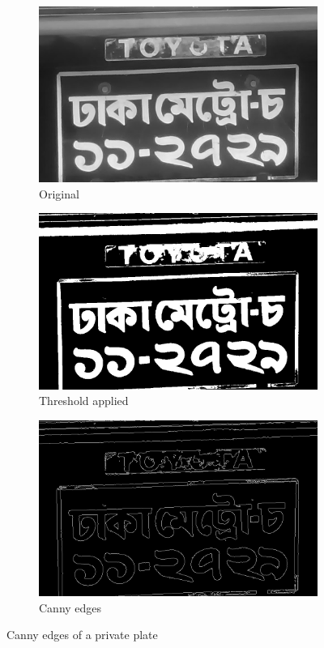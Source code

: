 \begin{figure}
\begin{subfigure}{0.33\textwidth}
    \centering
    \includegraphics[width=0.9\linewidth]{./img/experiment/stage.9/02-private}
    \caption{Original}
\end{subfigure}
\begin{subfigure}{0.33\textwidth}
    \centering
    \includegraphics[width=0.9\linewidth]{./img/experiment/stage.10/02-private}
    \caption{Threshold applied}
\end{subfigure}
\begin{subfigure}{0.33\textwidth}
    \centering
    \includegraphics[width=0.9\linewidth]{./img/experiment/stage.11/02-private}
    \caption{Canny edges}
\end{subfigure}
\caption{Canny edges of a private plate}
\label{fig:CannyResult3}
\end{figure}


